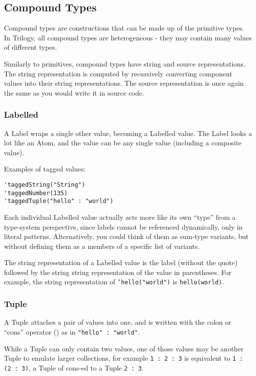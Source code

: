 \subsection{Compound Types}

Compound types are constructions that can be made up of the primitive
types. In Trilogy, all compound types are heterogeneous - they may
contain many values of different types.

Similarly to primitives, compound types have string and source
representations. The string representation is computed by recursively
converting component values into their string representations. The
source representation is once again the same as you would write it
in source code.

\subsubsection{Labelled}

A Label wraps a single other value, becoming a Labelled value. The Label
looks a lot like an Atom, and the value can be any single value (including
a composite value).

Examples of tagged values:

\begin{lstlisting}[language=Trilogy]
'taggedString("String")
'taggedNumber(135)
'taggedTuple("hello" : "world")
\end{lstlisting}

Each individual Labelled value actually acts more like its own ``type'' from
a type-system perspective, since labels cannot be referenced dynamically, only
in literal patterns. Alternatively, you could think of them as sum-type variants,
but without defining them as a members of a specific list of variants.

The string representation of a Labelled value is the label (without the quote)
followed by the string string representation of the value in parentheses.
For example, the string representation of \texttt{'hello("world")} is
\texttt{hello(world)}.

\subsubsection{Tuple}

A Tuple attaches a pair of values into one, and is written with the colon or
``cons'' operator (\op{:}) as in  \texttt{"hello" : "world"}.

While a Tuple can only contain two values, one of those values may be another
Tuple to emulate larger collections, for example \texttt{1 : 2 : 3} is equivalent
to \texttt{1 : (2 : 3)}, a Tuple of  cons-ed to a Tuple \texttt{2 : 3}.


